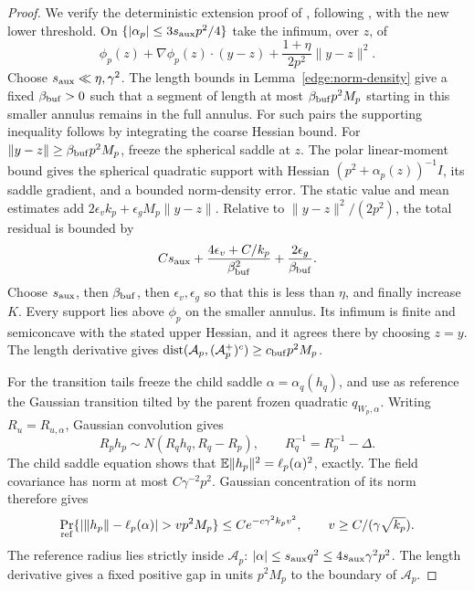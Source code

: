 \begin{proof}
We verify the deterministic extension proof of \cite[Lemma~4.3]{FUA},
following \cite[Proposition~16.1]{CM}, with the new lower threshold.
On \(\{|\alpha_p|\le3s_{\rm aux}p^2/4\}\) take the infimum, over \(z\), of
\[
 \phi_p(z)+\nabla\phi_p(z)\cdot(y-z)
       +\frac{1+\eta}{2p^2}\|y-z\|^2.
\]
Choose \(s_{\rm aux}\ll\eta,\gamma^2\).  The length bounds in
Lemma~\ref{edge:norm-density} give a fixed
\(\beta_{\rm buf}>0\) such that a segment of length at most
\(\beta_{\rm buf}p^2M_p\) starting in this smaller annulus remains in
the full annulus.  For such pairs the supporting inequality follows
by integrating the coarse Hessian bound.  For
\(\|y-z\|\ge\beta_{\rm buf}p^2M_p\), freeze the spherical saddle at
\(z\).  The polar linear-moment bound gives the spherical quadratic
support with Hessian \((p^2+\alpha_p(z))^{-1}I\), its saddle gradient,
and a bounded norm-density error.  The static value and mean estimates
add \(2\epsilon_vk_p+\epsilon_gM_p\|y-z\|\).  Relative to
\(\|y-z\|^2/(2p^2)\), the total residual is bounded by
\[
 Cs_{\rm aux}+\frac{4\epsilon_v+C/k_p}{\beta_{\rm buf}^2}
       +\frac{2\epsilon_g}{\beta_{\rm buf}} .
\]
Choose \(s_{\rm aux}\), then \(\beta_{\rm buf}\), then \(\epsilon_v,\epsilon_g\)
so that this is less than \(\eta\), and finally increase \(K\).
Every support lies above \(\phi_p\) on the smaller annulus.  Its
infimum is finite and semiconcave with the stated upper Hessian, and
it agrees there by choosing \(z=y\).  The length derivative gives
\(\operatorname{dist}(\mathcal A_p,(\mathcal A_p^+)^c)\ge c_{\rm buf}p^2M_p\).

For the transition tails freeze the child saddle
\(\alpha=\alpha_q(h_q)\), and use as reference the Gaussian transition
tilted by the parent frozen quadratic \(q_{W_p,\alpha}\).
Writing \(R_u=R_{u,\alpha}\), Gaussian convolution gives
\begin{equation}\label{edge:reference-transition}
 R_ph_p\sim N(R_qh_q,R_q-R_p),\qquad R_q^{-1}=R_p^{-1}-\Delta.
\end{equation}
The child saddle equation shows that
\(\mathbb E\|h_p\|^2=\ell_p(\alpha)^2\), exactly.  The field covariance has
norm at most \(C\gamma^{-2}p^2\).  Gaussian concentration of its norm
therefore gives
\[
 \Pr_{\rm ref}\{|\|h_p\|-\ell_p(\alpha)|>vp^2M_p\}
       \le C e^{-c\gamma^2k_pv^2},
 \qquad v\ge C/(\gamma\sqrt{k_p}).
\]
The reference radius lies strictly inside \(\mathcal A_p\):
\(|\alpha|\le s_{\rm aux}q^2\le4s_{\rm aux}\gamma^2p^2\).
The length derivative gives a fixed positive gap in units \(p^2M_p\)
to the boundary of \(\mathcal A_p\).


\end{proof}
